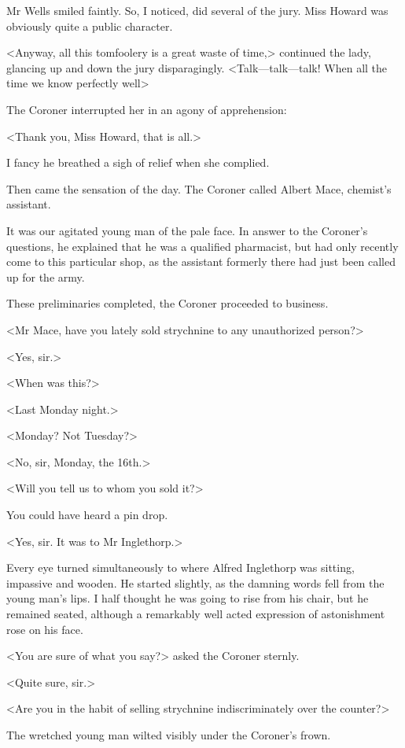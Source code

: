  Mr Wells smiled faintly. So, I noticed, did several of the jury. Miss Howard was obviously quite a public character. 

 <Anyway, all this tomfoolery is a great waste of time,> continued the lady, glancing up and down the jury disparagingly. <Talk—talk—talk! When all the time we know perfectly well\longdash> 

 The Coroner interrupted her in an agony of apprehension: 

 <Thank you, Miss Howard, that is all.> 

 I fancy he breathed a sigh of relief when she complied. 

 Then came the sensation of the day. The Coroner called Albert Mace, chemist's assistant. 

 It was our agitated young man of the pale face. In answer to the Coroner's questions, he explained that he was a qualified pharmacist, but had only recently come to this particular shop, as the assistant formerly there had just been called up for the army. 

 These preliminaries completed, the Coroner proceeded to business. 

 <Mr Mace, have you lately sold strychnine to any unauthorized person?> 

 <Yes, sir.> 

 <When was this?> 

 <Last Monday night.> 

 <Monday? Not Tuesday?> 

 <No, sir, Monday, the 16th.> 

 <Will you tell us to whom you sold it?> 

 You could have heard a pin drop. 

 <Yes, sir. It was to Mr Inglethorp.> 

 Every eye turned simultaneously to where Alfred Inglethorp was sitting, impassive and wooden. He started slightly, as the damning words fell from the young man's lips. I half thought he was going to rise from his chair, but he remained seated, although a remarkably well acted expression of astonishment rose on his face. 

 <You are sure of what you say?> asked the Coroner sternly. 

 <Quite sure, sir.> 

 <Are you in the habit of selling strychnine indiscriminately over the counter?> 

 The wretched young man wilted visibly under the Coroner's frown. 

